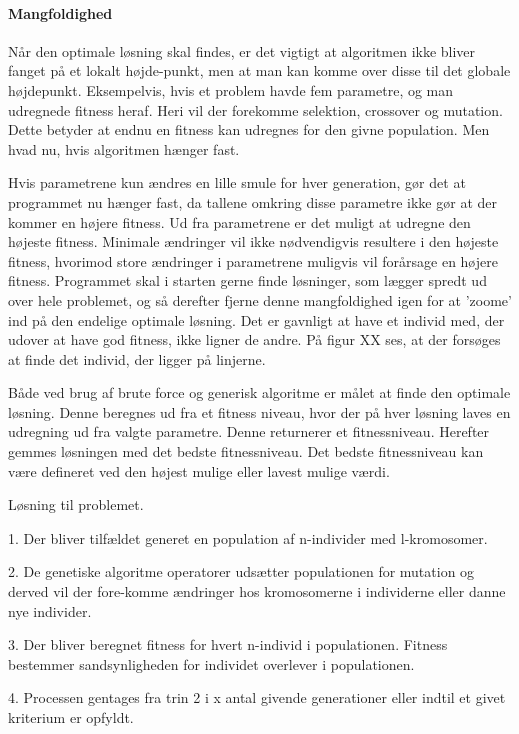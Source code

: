 \paragraph{Mangfoldighed}

Når den optimale løsning skal findes, er det vigtigt at algoritmen ikke bliver fanget på et lokalt højde-punkt, men at man kan komme over disse til det globale højdepunkt. Eksempelvis, hvis et problem havde fem parametre, og man udregnede fitness heraf. Heri vil der forekomme selektion, crossover og mutation. Dette betyder at endnu en fitness kan udregnes for den givne population. Men hvad nu, hvis algoritmen hænger fast. 

Hvis parametrene kun ændres en lille smule for hver generation, gør det at programmet nu hænger fast, da tallene omkring disse parametre ikke gør at der kommer en højere fitness. Ud fra parametrene er det muligt at udregne den højeste fitness. Minimale ændringer vil ikke nødvendigvis resultere i den højeste fitness, hvorimod store ændringer i parametrene muligvis vil forårsage en højere fitness. Programmet skal i starten gerne finde løsninger, som lægger spredt ud over hele problemet, og så derefter fjerne denne mangfoldighed igen for at ’zoome’ ind på den endelige optimale løsning. 
Det er gavnligt at have et individ med, der udover at have god fitness, ikke ligner de andre. På figur XX%
 ses, at der forsøges at finde det individ, der ligger på linjerne.

Både ved brug af brute force og generisk algoritme er målet at finde den optimale løsning. Denne beregnes ud fra et fitness niveau, hvor der på hver løsning laves en udregning ud fra valgte parametre. Denne returnerer et fitnessniveau. Herefter gemmes løsningen med det bedste fitnessniveau. Det bedste fitnessniveau kan være defineret ved den højest mulige eller lavest mulige værdi.

Løsning til problemet.

1.	Der bliver tilfældet generet en population af n-individer med l-kromosomer.


2.	De genetiske algoritme operatorer udsætter populationen for mutation og derved vil der fore-komme ændringer hos kromosomerne i individerne eller danne nye individer.


3.	Der bliver beregnet fitness for hvert n-individ i populationen. Fitness bestemmer sandsynligheden for individet overlever i populationen.


4.	Processen gentages fra trin 2 i x antal givende generationer eller indtil et givet kriterium er opfyldt.


